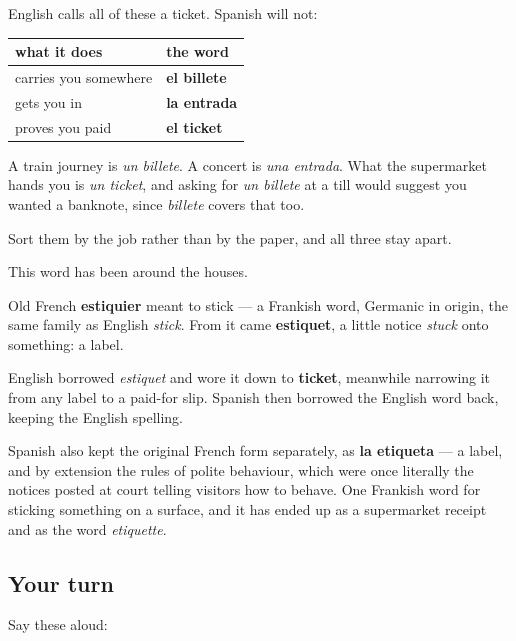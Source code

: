 \begin{grammarlens}[title={Grammar Lens: three slips of paper, three words}]
English calls all of these a ticket. Spanish will not:

\noindent
\begin{tabularx}{\linewidth}{@{}>{\raggedright\arraybackslash}X>{\raggedright\arraybackslash}X@{}}
\toprule
\textbf{what it does} & \textbf{the word} \\
\midrule
carries you somewhere & \textbf{el billete} \\
gets you in & \textbf{la entrada} \\
proves you paid & \textbf{el ticket} \\
\bottomrule
\end{tabularx}

A train journey is \emph{un billete}. A concert is \emph{una entrada}. What the supermarket hands you is \emph{un ticket}, and asking for \emph{un billete} at a till would suggest you wanted a banknote, since \emph{billete} covers that too.

Sort them by the job rather than by the paper, and all three stay apart.
\end{grammarlens}

\begin{cousinweb}
This word has been around the houses.

Old French \textbf{estiquier} meant to stick — a Frankish word, Germanic in origin, the same family as English \emph{stick}. From it came \textbf{estiquet}, a little notice \emph{stuck} onto something: a label.

English borrowed \emph{estiquet} and wore it down to \textbf{ticket}, meanwhile narrowing it from any label to a paid-for slip. Spanish then borrowed the English word back, keeping the English spelling.

Spanish also kept the original French form separately, as \textbf{la etiqueta} — a label, and by extension the rules of polite behaviour, which were once literally the notices posted at court telling visitors how to behave. One Frankish word for sticking something on a surface, and it has ended up as a supermarket receipt and as the word \emph{etiquette}.
\end{cousinweb}

\subsection*{Your turn}
Say these aloud:

